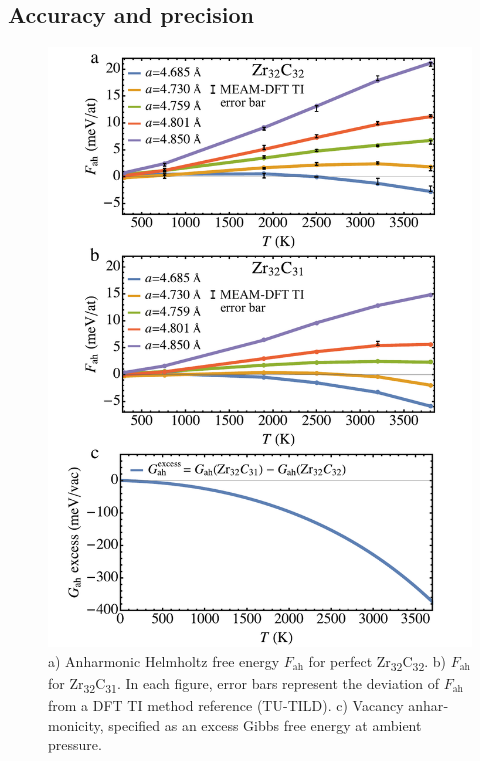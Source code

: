 \documentclass[twocolumn,american,aps,prb,showpacs,showkeys,amsmath,amssymb,superscriptaddress,a4]{revtex4-1}
\begin{document}
\subsection{Accuracy and precision\label{subsec: benchMarksAccuracy}}
\begin{center}
\begin{figure}[H]
\begin{centering}
\includegraphics[scale=0.4]{Fig4_pltFah_correctedErrorBars}
\par\end{centering}
\caption{\foreignlanguage{american}{a) Anharmonic Helmholtz free energy $F_{\text{ah}}$ for perfect Zr\protect\textsubscript{32}C\protect\textsubscript{32}.
b) $F_{\text{ah}}$ for Zr\protect\textsubscript{32}C\protect\textsubscript{31}.
In each figure, error bars represent the deviation of $F_{\text{ah}}$
from a DFT TI method reference (TU-TILD\cite{Duff2015}). c)
Vacancy anharmonicity, specified as an excess Gibbs free energy at
ambient pressure.
 \label{fig: pltFah}}}
\end{figure}
\par\end{center}
\end{document}
